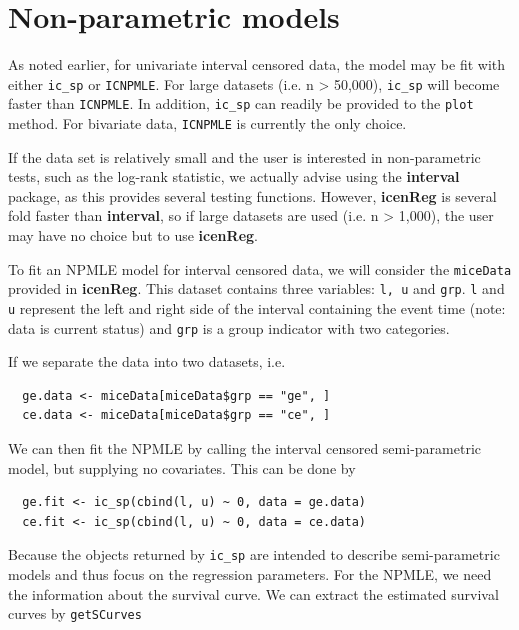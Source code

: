 \documentclass[11pt]{report}
\begin{document}
  \section{Non-parametric models}
  
  As noted earlier, for univariate interval censored data, the model may be fit with either
  \texttt{ic\_sp} or \texttt{ICNPMLE}. For large datasets (i.e. n > 50,000), \texttt{ic\_sp} 
  will become faster than \texttt{ICNPMLE}. In addition, \texttt{ic\_sp} can readily be 
  provided to the \texttt{plot} method. For bivariate data, \texttt{ICNPMLE} is currently
  the only choice. 
  
  If the data set is relatively small and the user is interested in non-parametric tests,
  such as the log-rank statistic, we actually advise using the {\bf interval} package,
  as this provides several testing functions. However, {\bf icenReg} is several fold 
  faster than {\bf interval}, so if large datasets are used (i.e. n > 1,000), the user
  may have no choice but to use {\bf icenReg}.
  
  To fit an NPMLE model for interval censored data, we will consider the \texttt{miceData}
  provided in {\bf icenReg}. This dataset contains three variables: \texttt{l, u} and
  \texttt{grp}. \texttt{l} and \texttt{u} represent the left and right side of the interval
  containing the event time (note: data is current status) and \texttt{grp} is a group
  indicator with two categories.
  
  If we separate the data into two datasets, i.e. 
  
  \begin{verbatim}
  ge.data <- miceData[miceData$grp == "ge", ]
  ce.data <- miceData[miceData$grp == "ce", ]
  \end{verbatim}

  We can then fit the NPMLE by calling the interval censored semi-parametric model, 
  but supplying no covariates. This can be done by 
  
  \begin{verbatim}
  ge.fit <- ic_sp(cbind(l, u) ~ 0, data = ge.data)
  ce.fit <- ic_sp(cbind(l, u) ~ 0, data = ce.data)
  \end{verbatim}

  Because the objects returned by \texttt{ic\_sp} are intended
  to describe semi-parametric models and thus focus on the 
  regression parameters. For the NPMLE, we need the information
  about the survival curve. 
  We can extract the estimated survival curves by \texttt{getSCurves}
  
\end{document}
